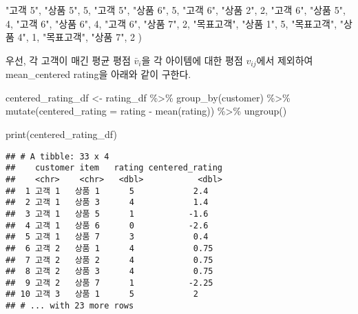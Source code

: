 \documentclass[
]{book}
\newenvironment{Shaded}{\begin{snugshade}}{\end{snugshade}}
\newcommand{\AttributeTok}[1]{\textcolor[rgb]{0.77,0.63,0.00}{#1}}
\newcommand{\DecValTok}[1]{\textcolor[rgb]{0.00,0.00,0.81}{#1}}
\newcommand{\FunctionTok}[1]{\textcolor[rgb]{0.00,0.00,0.00}{#1}}
\newcommand{\NormalTok}[1]{#1}
\newcommand{\OtherTok}[1]{\textcolor[rgb]{0.56,0.35,0.01}{#1}}
\newcommand{\SpecialCharTok}[1]{\textcolor[rgb]{0.00,0.00,0.00}{#1}}
\newcommand{\StringTok}[1]{\textcolor[rgb]{0.31,0.60,0.02}{#1}}
\begin{document}
\begin{Shaded}
\begin{Highlighting}[]
  \StringTok{"고객 5"}\NormalTok{, }\StringTok{"상품 5"}\NormalTok{, }\DecValTok{5}\NormalTok{,}
  \StringTok{"고객 5"}\NormalTok{, }\StringTok{"상품 6"}\NormalTok{, }\DecValTok{5}\NormalTok{,}
  \StringTok{"고객 6"}\NormalTok{, }\StringTok{"상품 2"}\NormalTok{, }\DecValTok{2}\NormalTok{,}
  \StringTok{"고객 6"}\NormalTok{, }\StringTok{"상품 5"}\NormalTok{, }\DecValTok{4}\NormalTok{,}
  \StringTok{"고객 6"}\NormalTok{, }\StringTok{"상품 6"}\NormalTok{, }\DecValTok{4}\NormalTok{,}
  \StringTok{"고객 6"}\NormalTok{, }\StringTok{"상품 7"}\NormalTok{, }\DecValTok{2}\NormalTok{,}
  \StringTok{"목표고객"}\NormalTok{, }\StringTok{"상품 1"}\NormalTok{, }\DecValTok{5}\NormalTok{,}
  \StringTok{"목표고객"}\NormalTok{, }\StringTok{"상품 4"}\NormalTok{, }\DecValTok{1}\NormalTok{,}
  \StringTok{"목표고객"}\NormalTok{, }\StringTok{"상품 7"}\NormalTok{, }\DecValTok{2}
\NormalTok{)}
\end{Highlighting}
\end{Shaded}

우선, 각 고객이 매긴 평균 평점 \(\bar{v}_i\)을 각 아이템에 대한 평점 \(v_{ij}\)에서 제외하여 mean\_centered rating을 아래와 같이 구한다.

\begin{Shaded}
\begin{Highlighting}[]
\NormalTok{centered\_rating\_df }\OtherTok{\textless{}{-}}\NormalTok{ rating\_df }\SpecialCharTok{\%\textgreater{}\%}
  \FunctionTok{group\_by}\NormalTok{(customer) }\SpecialCharTok{\%\textgreater{}\%}
  \FunctionTok{mutate}\NormalTok{(}\AttributeTok{centered\_rating =}\NormalTok{ rating }\SpecialCharTok{{-}} \FunctionTok{mean}\NormalTok{(rating)) }\SpecialCharTok{\%\textgreater{}\%}
  \FunctionTok{ungroup}\NormalTok{()}

\FunctionTok{print}\NormalTok{(centered\_rating\_df)}
\end{Highlighting}
\end{Shaded}

\begin{verbatim}
## # A tibble: 33 x 4
##    customer item   rating centered_rating
##    <chr>    <chr>   <dbl>           <dbl>
##  1 고객 1   상품 1      5            2.4 
##  2 고객 1   상품 3      4            1.4 
##  3 고객 1   상품 5      1           -1.6 
##  4 고객 1   상품 6      0           -2.6 
##  5 고객 1   상품 7      3            0.4 
##  6 고객 2   상품 1      4            0.75
##  7 고객 2   상품 2      4            0.75
##  8 고객 2   상품 3      4            0.75
##  9 고객 2   상품 7      1           -2.25
## 10 고객 3   상품 1      5            2   
## # ... with 23 more rows
\end{verbatim}
\end{document}
